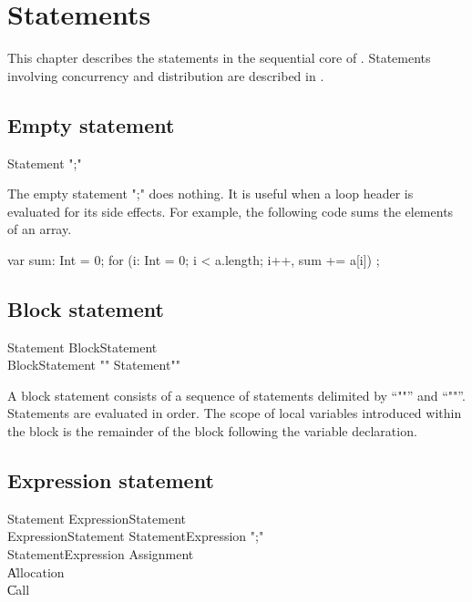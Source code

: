 \chapter{Statements}\label{XtenStatements}

This chapter describes the statements in the sequential core of
\Xten{}.  Statements involving concurrency and distribution
are described in .

\section{Empty statement}

\begin{grammar}
Statement \: \xcd";" \\
\end{grammar}

The empty statement \xcd";" does nothing.  It is useful when a
loop header is evaluated for its side effects.  For example,
the following code sums the elements of an array.
\begin{xten}
var sum: Int = 0;
for (i: Int = 0; i < a.length; i++, sum += a[i])
    ;
\end{xten}

\section{Block statement}

\begin{grammar}
Statement \: BlockStatement \\
BlockStatement \: \xcd"{" Statement\star \xcd"}" \\
\end{grammar}

A block statement consists of a sequence of statements delimited
by ``\xcd"{"'' and ``\xcd"}"''.  Statements are evaluated in
order.  The scope of local variables introduced within the block  
is the remainder of the block following the variable declaration.

\section{Expression statement}

\begin{grammar}
Statement \: ExpressionStatement \\
ExpressionStatement \: StatementExpression \xcd";" \\
StatementExpression \: Assignment \\
          \| Allocation \\
          \| Call \\
\end{grammar}

